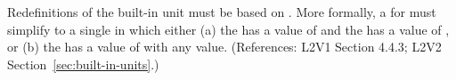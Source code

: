 Redefinitions of the built-in unit  must be based on
.  More formally, a \UnitDefinition for  must
simplify to a single \Unit in which either (a) the   has a
value of  and the   has a value of
, or (b) the   has a value of
 with any  value.  (References: L2V1
Section 4.4.3; L2V2 Section~\ref{sec:built-in-units}.)

